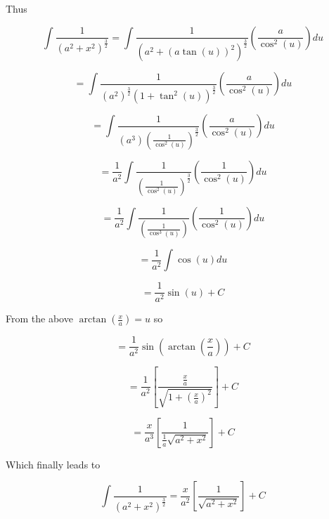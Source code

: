 \documentclass[14pt]{memoir}
\begin{document}
{Thus

\begin{equation}
\int \frac{1}{(a^2 + x^2)^{\frac{3}{2}}} =  \int \frac{1}{(a^2 + (a\tan{(u)})^2)^{\frac{3}{2}}} ( \frac{a}{\cos^2{(u)}}) du
\end{equation}

\begin{equation}
=  \int \frac{1}{(a^2)^{\frac{3}{2}} (1 + \tan^2{(u)})^{\frac{3}{2}}} ( \frac{a}{\cos^2{(u)}}) du
\end{equation}

\begin{equation}
=  \int \frac{1}{(a^3)(\frac{1}{\cos^2(u)})^{\frac{3}{2}}} ( \frac{a}{\cos^2{(u)}}) du
\end{equation}

\begin{equation}
=  \frac{1}{a^2} \int \frac{1}{(\frac{1}{\cos^2(u)})^{\frac{3}{2}}} ( \frac{1}{\cos^2{(u)}}) du
\end{equation}

\begin{equation}
=  \frac{1}{a^2} \int \frac{1}{(\frac{1}{\cos^3(u)})} ( \frac{1}{\cos^2{(u)}}) du
\end{equation}

\begin{equation}
=  \frac{1}{a^2} \int \cos{(u)} du
\end{equation}

\begin{equation}
=  \frac{1}{a^2} \sin{(u)} + C
\end{equation}


From the above $\arctan{(\frac{x}{a})} = u$ so

\begin{equation}
=  \frac{1}{a^2} \sin{(\arctan{(\frac{x}{a})})} + C
\end{equation}

\begin{equation}
=  \frac{1}{a^2} [\frac{\frac{x}{a}}{\sqrt{1+(\frac{x}{a})^2}}] + C
\end{equation}

\begin{equation}
=  \frac{x}{a^3} [\frac{1}{\frac{1}{a} \sqrt{a^2+x^2}}] + C
\end{equation}

Which finally leads to

\begin{equation}
\int \frac{1}{(a^2 + x^2)^{\frac{3}{2}}} =  \frac{x}{a^2} [\frac{1}{\sqrt{a^2+x^2}}] + C
\end{equation}





}
\end{document}
